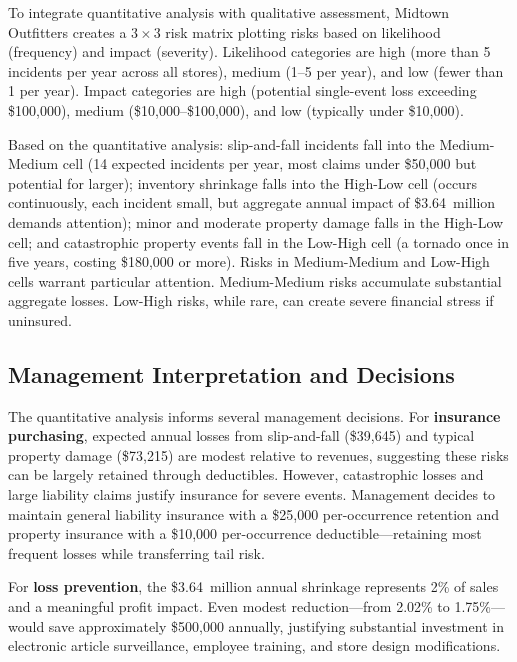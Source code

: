 \documentclass[11pt,openany]{book}
\begin{document}
To integrate quantitative analysis with qualitative assessment, Midtown
Outfitters creates a \(3 \times 3\) risk matrix plotting risks based on
likelihood (frequency) and impact (severity). Likelihood categories are high
(more than 5 incidents per year across all stores), medium (1--5 per year), and
low (fewer than 1 per year). Impact categories are high (potential single-event
loss exceeding \$100,000), medium (\$10,000--\$100,000), and low (typically
under \$10,000).

Based on the quantitative analysis: slip-and-fall incidents fall into the
Medium-Medium cell (14 expected incidents per year, most claims under \$50,000
but potential for larger); inventory shrinkage falls into the High-Low cell
(occurs continuously, each incident small, but aggregate annual impact of
\$3.64~million demands attention); minor and moderate property damage falls in
the High-Low cell; and catastrophic property events fall in the Low-High cell
(a tornado once in five years, costing \$180,000 or more). Risks in
Medium-Medium and Low-High cells warrant particular attention. Medium-Medium
risks accumulate substantial aggregate losses. Low-High risks, while rare, can
create severe financial stress if uninsured.

\subsection{Management Interpretation and Decisions}
\label{subsec:midtown-decisions}

The quantitative analysis informs several management decisions. For
\textbf{insurance purchasing}, expected annual losses from slip-and-fall
(\$39,645) and typical property damage (\$73,215) are modest relative to
revenues, suggesting these risks can be largely retained through deductibles.
However, catastrophic losses and large liability claims justify insurance for
severe events. Management decides to maintain general liability insurance with a
\$25,000 per-occurrence retention and property insurance with a \$10,000
per-occurrence deductible---retaining most frequent losses while transferring
tail risk.

For \textbf{loss prevention}, the \$3.64~million annual shrinkage represents
2\% of sales and a meaningful profit impact. Even modest reduction---from
2.02\% to 1.75\%---would save approximately \$500,000 annually, justifying
substantial investment in electronic article surveillance, employee training,
and store design modifications.
\end{document}
